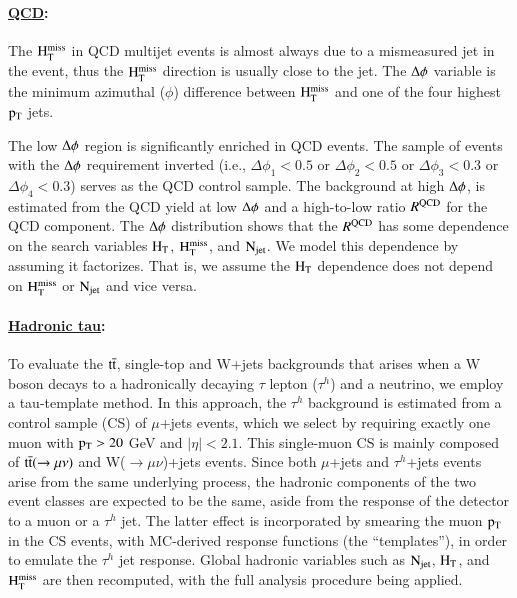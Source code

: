 \paragraph{\underline{QCD}: }
The $\rm H_{T}^{miss}$ in QCD multijet events is almost always due to a mismeasured jet in the event,
       thus the $\rm H_{T}^{miss}$ direction is usually close to the jet.
       The $\rm \Delta \phi$ variable is the minimum azimuthal ($\phi$) difference between $\rm H_{T}^{miss}$ and one of the four
       highest $\rm p_{T}$ jets.


       The low $\rm \Delta \phi$ region is significantly enriched in QCD events.
       The sample of events with the $\rm \Delta \phi$ requirement inverted
       (i.e., $\Delta \phi_1<0.5$ or $\Delta \phi_2<0.5$ or $\Delta \phi_3<0.3$ or $\Delta \phi_4<0.3$)
       serves as the QCD control sample.
       The background at high $\rm \Delta \phi$, is estimated from the QCD yield at low
       $\rm \Delta \phi$ and a high-to-low ratio $R^{\rm QCD}$ for the QCD component.
       The $\rm \Delta \phi$ distribution  shows that the $R^{\rm QCD}$
       has some dependence on the search variables $\rm H_{T}$, $\rm H_{T}^{miss}$, and $\rm N_{jet}$.
       We model this dependence by assuming it factorizes.  That is, we assume the $\rm H_{T}$
       dependence does not depend on $\rm H_{T}^{miss}$ or $\rm N_{jet}$ and vice versa.
\paragraph{\underline{Hadronic tau}: }

To evaluate the $\rm t\bar{t}$, single-top and W+jets backgrounds
that arises when a W boson decays to a hadronically decaying $\tau$ lepton ($\tau^{h}$) and a neutrino,
we employ a tau-template method. %
In this approach, the $\tau^{h}$ background is estimated from a control sample (CS)
of $\mu$+jets events,
which we select by requiring exactly one muon with $\rm p_{T}>20$ GeV and $|\eta|<2.1$. 
This single-muon CS is
mainly composed of $\rm t\bar{t}(\rightarrow \mu\nu)$ and W($\rightarrow \mu\nu$)+jets events.
Since both $\mu$+jets and $\tau^{h}$+jets events 
arise from the same underlying process,
the hadronic components of the two event classes are expected to be the same,
aside from the response of the 
detector to a muon or a $\tau^{h}$ jet. 
The latter effect is incorporated by smearing the muon $\rm p_{T}$ in the CS events,
with MC-derived response functions (the ``templates''),
in order to emulate the $\tau^{h}$ jet response.
Global hadronic variables such as $\rm N_{jet}$, $\rm H_{T}$, and $\rm H_{T}^{miss}$
are then recomputed, with the full analysis procedure being applied. 


